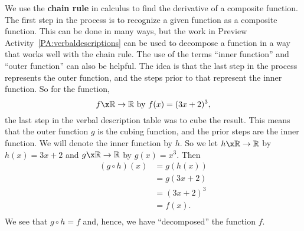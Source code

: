 We use the \textbf{chain rule}
%
 in calculus to find the derivative of a composite function.  The first step in the process is to recognize a given function as a composite function.  This can be done in many ways, but the work in Preview Activity~\ref{PA:verbaldescriptions} can be used to decompose a function in a way that works well with the chain rule.  The use of the terms ``inner function'' and ``outer function'' can also be helpful.  The idea is that the last step in the process represents the outer function, and the steps prior to that represent the inner function.  So for the function, 
\[
f\x \mathbb{R} \to \mathbb{R}\text{  by  }f( x ) = ( {3x + 2} )^3 ,
\]
the last step in the verbal description table was to cube the result.  This means that the outer function  $g$  is the cubing function, and the prior steps are the inner function.  We will denote the inner function by  $h$.  So we let  $h\x \mathbb{R} \to \mathbb{R}$ by  
$h( x ) = 3x + 2$ and  $g\x \mathbb{R} \to \mathbb{R}$ by  $g( x ) = x^3 $.  Then
\[
\begin{aligned}
  ( {g \circ h} )( x ) &= g\left( {h( x )} \right) \\ 
                       &= g( {3x + 2} ) \\ 
                       &= ( {3x + 2} )^3  \\ 
                       &= f( x ). \\ 
\end{aligned} 
\]
We see that  $g \circ h = f$\! and, hence, we have  ``decomposed''  the function  $f$.
\hbreak

